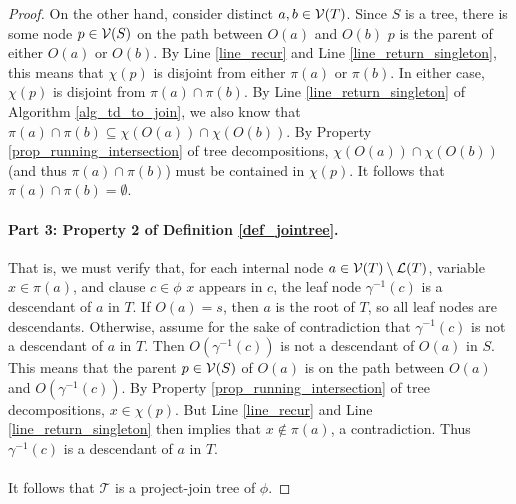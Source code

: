 \begin{proof}
    On the other hand, consider distinct $a, b \in \mathcal{V}(T)$. Since $S$ is a tree, there is some node $p \in \mathcal{V}(S)$ on the path between $O(a)$ and $O(b)$ \st{} $p$ is the parent of either $O(a)$ or $O(b)$. By Line \ref{line_recur} and Line \ref{line_return_singleton}, this means that $\chi(p)$ is disjoint from either $\pi(a)$ or $\pi(b)$. In either case, $\chi(p)$ is disjoint from $\pi(a) \cap \pi(b)$. By Line \ref{line_return_singleton} of Algorithm \ref{alg_td_to_join}, we also know that $\pi(a) \cap \pi(b) \subseteq \chi(O(a)) \cap \chi(O(b))$. By Property \ref{prop_running_intersection} of tree decompositions, $\chi(O(a)) \cap \chi(O(b))$ (and thus $\pi(a) \cap \pi(b)$) must be contained in $\chi(p)$. It follows that $\pi(a) \cap \pi(b) = \emptyset$.

\paragraph{Part 3: Property 2 of Definition \ref{def_jointree}.}
    That is, we must verify that, for each internal node $a \in \mathcal{V}(T) \setminus \mathcal{L}(T)$, variable $x \in \pi(a)$, and clause $c \in \phi$ \st{} $x$ appears in $c$, the leaf node $\gamma^{-1}(c)$ is a descendant of $a$ in $T$.
    If $O(a) = s$, then $a$ is the root of $T$, so all leaf nodes are descendants.
    Otherwise, assume for the sake of contradiction that $\gamma^{-1}(c)$ is not a descendant of $a$ in $T$.
    Then $O(\gamma^{-1}(c))$ is not a descendant of $O(a)$ in $S$.
    This means that the parent $p \in \mathcal{V}(S)$ of $O(a)$ is on the path between $O(a)$ and $O(\gamma^{-1}(c))$. 
    By Property \ref{prop_running_intersection} of tree decompositions, $x \in \chi(p)$.
    But Line \ref{line_recur} and Line \ref{line_return_singleton} then implies that $x \not\in \pi(a)$, a contradiction.
    Thus $\gamma^{-1}(c)$ is a descendant of $a$ in $T$.
    
\paragraph{} It follows that $\mathcal{T}$ is a project-join tree of $\phi$.
\end{proof}

